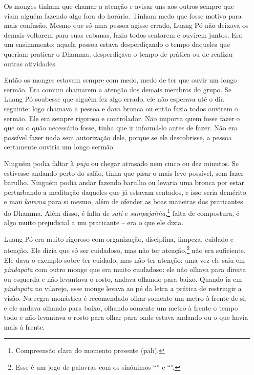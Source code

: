 Os monges tinham que chamar a atenção e avisar uns aos outros sempre que
viam alguém fazendo algo fora do horário. Tinham medo que fosse motivo
para mais confusão. Mesmo que só uma pessoa agisse errado, Luang Pó não
deixava os demais voltarem para suas cabanas, fazia todos sentarem e
ouvirem juntos. Era um ensinamento: aquela pessoa estava desperdiçando o
tempo daqueles que queriam praticar o Dhamma, desperdiçava o tempo de
prática ou de realizar outras atividades.

Então os monges estavam sempre com medo, medo de ter que ouvir um longo
sermão. Era comum chamarem a atenção dos demais membros do grupo. Se
Luang Pó soubesse que alguém fez algo errado, ele não esperava até o dia
seguinte: logo chamava a pessoa e dava bronca ou então fazia todos
ouvirem o sermão. Ele era sempre rigoroso e controlador. Não importa
quem fosse fazer o que ou o quão necessário fosse, tinha que ir
informá-lo antes de fazer. Não era possível fazer nada sem autorização
dele, porque se ele descobrisse, a pessoa certamente ouviria um longo
sermão.

Ninguém podia faltar à \emph{pūja} ou chegar atrasado nem cinco ou dez
minutos. Se estivesse andando perto do salão, tinha que pisar o mais
leve possível, sem fazer barulho. Ninguém podia andar fazendo barulho ou
levaria uma bronca por estar perturbando a meditação daqueles que já
estavam sentados, e isso seria demérito e mau \emph{kamma} para si
mesmo, além de ofender as boas maneiras dos praticantes do Dhamma. Além
disso, é falta de \emph{sati} e \emph{sampajañña},\footnote{Compreensão
  clara do momento presente (pāli).} falta de compostura, é algo muito
prejudicial a um praticante -- era o que ele dizia.

Luang Pó era muito rigoroso com organização, disciplina, limpeza,
cuidado e atenção. Ele dizia que só ser cuidadoso, mas não ter
\mbox{atenção},\footnote{Esse é um jogo de palavras com os sinônimos ``'' e
  ``''.} não era suficiente. Ele dava o exemplo sobre ter cuidado,
mas não ter atenção: uma vez ele saiu em \emph{pindapāta} com outro
monge que era muito cuidadoso: ele não olhava para direita ou esquerda e
não levantava o rosto, andava olhando para baixo. Quando ia em
\emph{pindapāta} no vilarejo, esse monge levava ao pé da letra a prática
de restringir a visão. Na regra monástica é recomendado olhar somente um
metro à frente de si, e ele andava olhando para baixo, olhando somente
um metro à frente o tempo todo e não levantava o rosto para olhar para
onde estava andando ou o que havia mais à frente.

